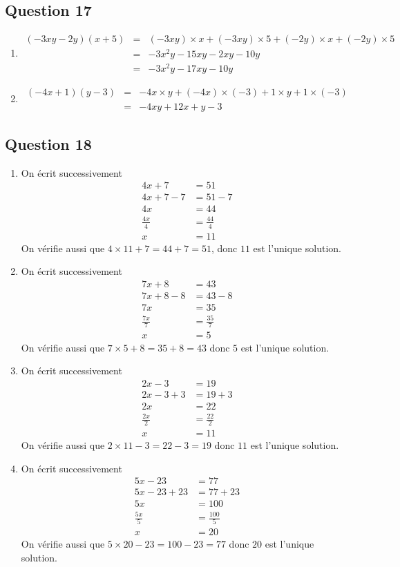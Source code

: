 \documentclass[12 pt]{extarticle}
\theoremstyle{plain}
\begin{document}
\subsection*{Question 17}
\begin{enumerate}
\item 
\begin{eqnarray*}(-3xy-2y)(x+5)& = &
(-3xy)\times x + (-3xy) \times 5
+ (-2y) \times x 
+ (-2y) \times 5 \\&=& 
-3x^2y -15xy -2xy -10 y \\
&=& -3x^2y-17xy-10y\end{eqnarray*}
\item \begin{eqnarray*}
(-4x+1)(y-3) &=& -4x\times y + (-4x) \times (-3) + 1\times y + 1\times (-3) \\
&=& -4xy +12x+y-3
\end{eqnarray*}
\end{enumerate}
\subsection*{Question 18}
\begin{enumerate}
\item On écrit successivement 
\begin{align*}
4x + 7 &= 51 \\
4x + 7 - 7 &= 51- 7 \\
4x &= 44 \\ 
\frac{4x}4  &=\frac{44}4\\
x &= 11 
\end{align*}
On vérifie aussi que $4\times 11+ 7 = 44+7 = 51$, donc $11$ est l'unique solution.
\item On écrit successivement 
\begin{align*}
7x + 8 &= 43 \\
7x+8 -8 &= 43-8\\
7x &= 35 \\ 
\frac{7x}7  &=\frac{35}7\\
x &= 5
\end{align*}
On vérifie aussi que $7\times 5+8 = 35+8 = 43$ donc $5$ est l'unique solution.
\item On écrit successivement 
\begin{align*}
2x-3 &= 19 \\
2x-3+3 &= 19+3\\
2x &= 22 \\ 
\frac{2x}2  &=\frac{22}2\\
x &= 11
\end{align*}
On vérifie aussi que $2\times11-3 = 22-3=19$ donc $11$ est l'unique solution.
\item On écrit successivement 
\begin{align*}
5x-23 &= 77 \\
5x-23+23 &= 77+23\\
5x &= 100 \\ 
\frac{5x}5  &=\frac{100}5\\
x &= 20
\end{align*}
On vérifie aussi que $5\times 20 - 23 = 100 - 23 = 77$ donc $20$ est l'unique solution.
\end{enumerate}
\end{document}
